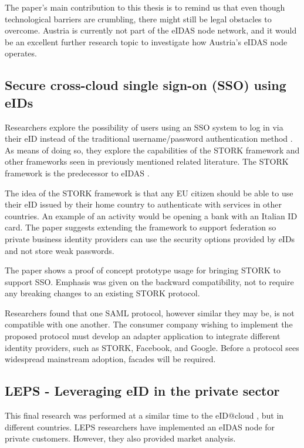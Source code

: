 The paper's main contribution to this thesis is to remind us that even though technological barriers are crumbling, there might still be legal obstacles to overcome. Austria is currently not part of the eIDAS node network, and it would be an excellent further research topic to investigate how Austria's eIDAS node operates.

\subsection{Secure cross-cloud single sign-on (SSO) using eIDs}

Researchers explore the possibility of users using an SSO system to log in via their eID instead of the traditional username/password authentication method \cite{secure-signon}. As means of doing so, they explore the capabilities of the STORK framework and other frameworks seen in previously mentioned related literature. The STORK framework is the predecessor to eIDAS \cite{stork}.

The idea of the STORK framework is that any EU citizen should be able to use their eID issued by their home country to authenticate with services in other countries. An example of an activity would be opening a bank with an Italian ID card. The paper suggests extending the framework to support federation so private business identity providers can use the security options provided by eIDs and not store weak passwords.

The paper shows a proof of concept prototype usage for bringing STORK to support SSO. Emphasis was given on the backward compatibility, not to require any breaking changes to an existing STORK protocol.

Researchers found that one SAML protocol, however similar they may be, is not compatible with one another. The consumer company wishing to implement the proposed protocol must develop an adapter application to integrate different identity providers, such as STORK, Facebook, and Google. Before a protocol sees widespread mainstream adoption, facades will be required.

\subsection{LEPS - Leveraging eID in the private sector}

This final research \cite{Martin2019303} was performed at a similar time to the eID@cloud \cite{guerola2019eid}, but in different countries. LEPS researchers 
have implemented an eIDAS node for private customers. However, they also provided market analysis.

